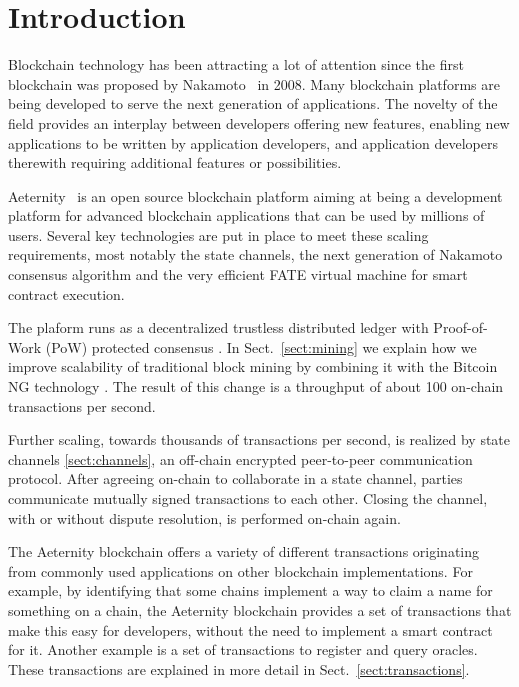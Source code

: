 \section{Introduction}

Blockchain technology has been attracting a lot of attention since the
first blockchain was proposed by Nakamoto~\cite{SN} in 2008.
Many blockchain platforms are being developed to serve the next
generation of applications. The novelty of the field provides an
interplay between developers offering new features, enabling new
applications to be written by application developers, and application
developers therewith requiring additional features or possibilities.

Aeternity~\cite{AE,UlfWigerCodeMesh2018} is an open source blockchain
platform aiming at being a development platform for
advanced blockchain applications that can be used by millions of
users. Several key technologies are put in place to meet these scaling
requirements, most notably the state channels, the next generation of
Nakamoto consensus algorithm and the very efficient FATE virtual
machine for smart contract execution.

The plaform runs as a decentralized trustless distributed
ledger with Proof-of-Work (PoW) protected consensus \cite{Tromp2015CuckooCA}.
In Sect.~\ref{sect:mining} we explain how we improve scalability of traditional
block mining by combining it with the Bitcoin NG technology
\cite{Eyal:2016:BSB:2930611.2930615}. The result of this change
is a throughput of about 100 on-chain transactions per second.

Further scaling, towards thousands of transactions per second, is
realized by state channels \ref{sect:channels}, an off-chain encrypted
peer-to-peer communication protocol. After agreeing on-chain to
collaborate in a state channel, parties communicate mutually signed
transactions to each other. Closing the channel, with or without
dispute resolution, is performed on-chain again.

The Aeternity blockchain offers a variety of different transactions originating from commonly
used applications on other blockchain implementations. For example, by
identifying that some chains implement a way to claim a name for
something on a chain, the Aeternity blockchain provides a set of
transactions that make this easy for developers, without the need to
implement a smart contract for it. Another example is a set of transactions to register and
query oracles. These transactions are explained in more detail in
Sect.\ \ref{sect:transactions}.

